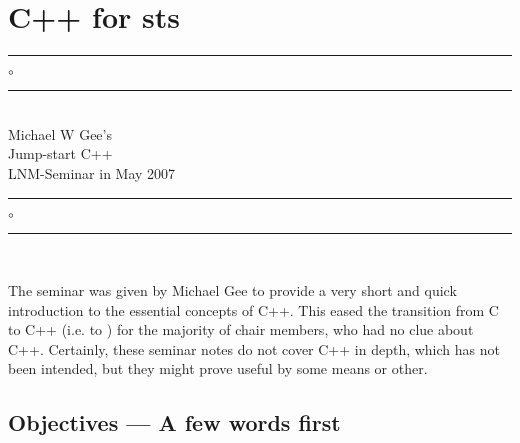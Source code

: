 





\chapter{C++ for \baci{}sts}

\begin{center}
\rule[0.5ex]{5cm}{1pt} $\circ$ \rule[0.5ex]{5cm}{1pt}\\[2ex]
{\LARGE{Michael W Gee's}}\\[3ex]
{\huge{Jump-start C++}}\\[2ex]
{\normalsize{LNM-Seminar in May 2007}}\\[-1ex]
\rule[0.5ex]{5cm}{1pt} $\circ$ \rule[0.5ex]{5cm}{1pt}\\
\parbox{9cm}{\small The seminar was given by Michael Gee to provide a
very short and quick introduction to the
essential concepts of C++. This eased the transition from C to C++
(i.e. \ccarat{} to \baci{}) for
the majority of chair members, who had no clue about C++. Certainly, these
seminar notes do not cover C++ in depth, which has not been intended, but they
might prove useful by some means or other.}
\end{center}


\section{Objectives --- A few words first}


